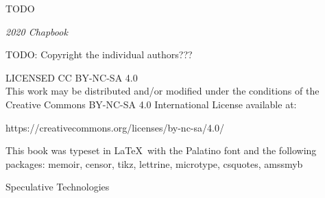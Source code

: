 



\pagestyle{empty}

\frontmatter

{
\null\vfill

\begin{flushleft}

{\small
TODO

\textit{2020 Chapbook}


TODO: Copyright the individual authors???

\bigskip


LICENSED CC BY-NC-SA 4.0 \\
This work may be distributed and/or modified under the conditions of the Creative Commons BY-NC-SA 4.0 International License available at:
\begin{chatlog}
https://creativecommons.org/licenses/by-nc-sa/4.0/
\end{chatlog}

This book was typeset in \LaTeX\ with the Palatino font and the following packages:
  memoir,
  censor,
  tikz,
  lettrine,
  microtype,
  csquotes,
  amssmyb

\bigskip

}


\end{flushleft}
}


\clearpage

\begingroup%
\centering
\vspace*{24pt}
{\Huge Speculative Technologies}\\[\baselineskip]
{}\\[\baselineskip]
\vfill\null
\endgroup



{\setlength{\beforechapskip}{0pt}
\begin{KeepFromToc}
  \tableofcontents*
\end{KeepFromToc}
}

\mainmatter

\raggedbottom
\pagestyle{plain}


